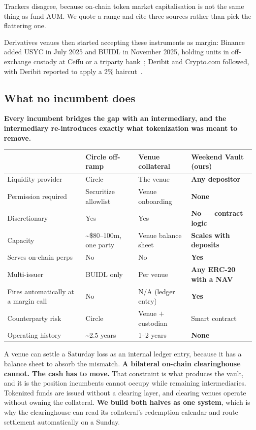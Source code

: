 \documentclass[11pt,a4paper]{article}
\newcommand{\note}[1]{{\small\color{muted}#1}}
\begin{document}
\note{Trackers disagree, because on-chain token market capitalisation is not the same thing as fund
AUM. We quote a range and cite three sources rather than pick the flattering one.}

Derivatives venues then started accepting these instruments as margin: Binance added USYC in July
2025 and BUIDL in November 2025, holding units in off-exchange custody at Ceffu or a triparty
bank~\cite{binance,protofire}; Deribit and Crypto.com followed, with Deribit reported to apply a 2\%
haircut~\cite{deribit,protofire}.

\subsection{What no incumbent does}

\textbf{Every incumbent bridges the gap with an intermediary, and the intermediary re-introduces
exactly what tokenization was meant to remove.}

\begin{center}
\small
\begin{tabular}{@{}p{4.0cm}p{2.9cm}p{2.9cm}p{4.4cm}@{}}
\toprule
& \textbf{Circle off-ramp} & \textbf{Venue collateral} & \textbf{Weekend Vault (ours)} \\
\midrule
Liquidity provider & Circle & The venue & \textbf{Any depositor} \\
Permission required & Securitize allowlist & Venue onboarding & \textbf{None} \\
Discretionary & Yes & Yes & \textbf{No --- contract logic} \\
Capacity & \textasciitilde\$80--100m, one party & Venue balance sheet & \textbf{Scales with deposits} \\
Serves on-chain perps & No & No & \textbf{Yes} \\
Multi-issuer & BUIDL only & Per venue & \textbf{Any ERC-20 with a NAV} \\
Fires automatically at a margin call & No & N/A (ledger entry) & \textbf{Yes} \\
Counterparty risk & Circle & Venue $+$ custodian & Smart contract \\
Operating history & \textasciitilde2.5 years & 1--2 years & \textbf{None} \\
\bottomrule
\end{tabular}
\end{center}

A venue can settle a Saturday loss as an internal ledger entry, because it has a balance sheet to
absorb the mismatch. \textbf{A bilateral on-chain clearinghouse cannot. The cash has to move.} That
constraint is what produces the vault, and it is the position incumbents cannot occupy while
remaining intermediaries. Tokenized funds are issued without a clearing layer, and clearing venues
operate without owning the collateral. \textbf{We build both halves as one system}, which is why the
clearinghouse can read its collateral's redemption calendar and route settlement automatically on a
Sunday.
\end{document}
